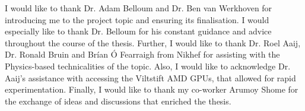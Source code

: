 \begin{acknowledgements}     

I would like to thank Dr. Adam Belloum and Dr. Ben van Werkhoven for introducing me to the project topic and ensuring its finalisation. I would especially like to thank Dr. Belloum for his constant guidance and advice throughout the course of the thesis. Further, I would like to thank Dr. Roel Aaij, Dr. Ronald Bruin and Brían Ó Fearraigh from Nikhef for assisting with the Physics-based technicalities of the topic. Also, I would like to acknowledge Dr. Aaij's assistance with accessing the Viltstift AMD GPUs, that allowed for rapid experimentation. Finally, I would like to thank my co-worker Arumoy Shome for the exchange of ideas and discussions that enriched the thesis.

\end{acknowledgements}

\let\cleardoublepage\clearpage
